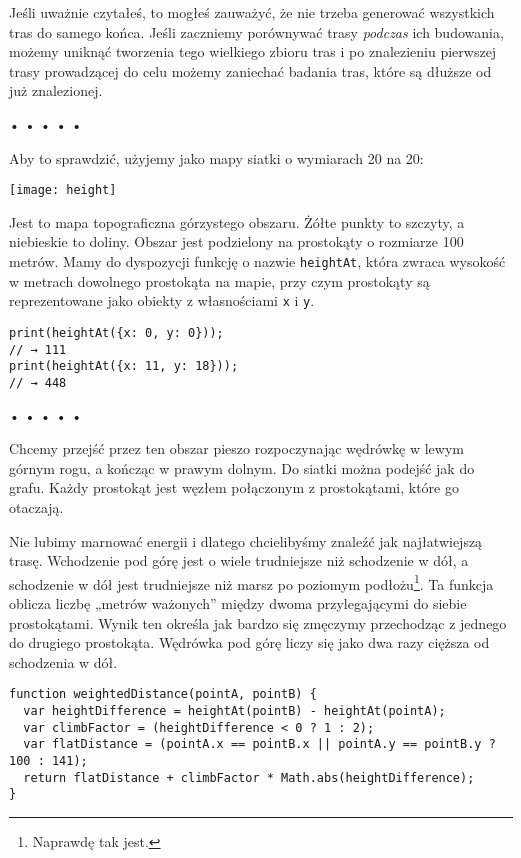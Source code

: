   
Jeśli uważnie czytałeś, to mogłeś zauważyć, że nie trzeba generować wszystkich tras do samego końca. Jeśli zaczniemy porównywać trasy \emph{podczas} ich budowania, możemy uniknąć tworzenia tego wielkiego zbioru tras i po znalezieniu pierwszej trasy prowadzącej do celu możemy zaniechać badania tras, które są dłuższe od już znalezionej.



\begin{center}
• • • • •
\end{center}

  
Aby to sprawdzić, użyjemy jako mapy siatki o wymiarach 20 na 20:

\bigskip 
\centerline{\texttt{[image: height]}} 
\smallskip
  
Jest to mapa topograficzna górzystego obszaru. Żółte punkty to szczyty, a niebieskie to doliny. Obszar jest podzielony na prostokąty o rozmiarze 100 metrów. Mamy do dyspozycji funkcję o nazwie \texttt{heightAt}, która zwraca wysokość w metrach dowolnego prostokąta na mapie, przy czym prostokąty są reprezentowane jako obiekty z własnościami \texttt{x} i \texttt{y}.

  
\begin{verbatim} 
print(heightAt({x: 0, y: 0}));
// → 111
print(heightAt({x: 11, y: 18}));
// → 448
\end{verbatim}


\begin{center}
• • • • •
\end{center}

  
Chcemy przejść przez ten obszar pieszo rozpoczynając wędrówkę w lewym górnym rogu, a kończąc w prawym dolnym. Do siatki można podejść jak do grafu. Każdy prostokąt jest węzłem połączonym z prostokątami, które go otaczają.

  
Nie lubimy marnować energii i dlatego chcielibyśmy znaleźć jak najłatwiejszą trasę. Wchodzenie pod górę jest o wiele trudniejsze niż schodzenie w dół, a schodzenie w dół jest trudniejsze niż marsz po poziomym podłożu\footnote{Naprawdę tak jest.}. Ta funkcja oblicza liczbę „metrów ważonych” między dwoma przylegającymi do siebie prostokątami. Wynik ten określa jak bardzo się zmęczymy przechodząc z jednego do drugiego prostokąta. Wędrówka pod górę liczy się jako dwa razy cięższa od schodzenia w dół.

  
\begin{verbatim} 
function weightedDistance(pointA, pointB) {
  var heightDifference = heightAt(pointB) - heightAt(pointA);
  var climbFactor = (heightDifference < 0 ? 1 : 2);
  var flatDistance = (pointA.x == pointB.x || pointA.y == pointB.y ? 100 : 141);
  return flatDistance + climbFactor * Math.abs(heightDifference);
}
 \end{verbatim}
  
